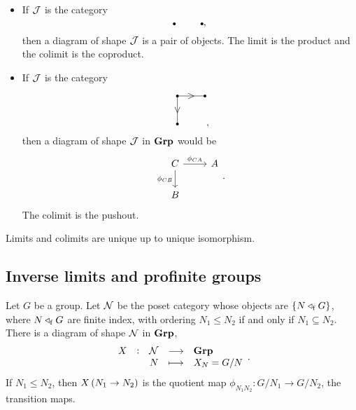 \begin{example}
\hfill
\begin{itemize}
\item If $ \mathcal{J} $ is the category
$$
\begin{tikzpicture}
\fill (0, 0) circle (0.05);
\fill (1, 0) circle (0.05);
\end{tikzpicture},
$$
then a diagram of shape $ \mathcal{J} $ is a pair of objects. The limit is the product and the colimit is the coproduct.
\item If $ \mathcal{J} $ is the category
$$
\begin{tikzpicture}
\fill (0, 0) circle (0.05);
\fill (1, 0) circle (0.05);
\fill (0, -1) circle (0.05);
\draw (0, 0) to node{$ > $} (1, 0);
\draw (0, 0) to node{$ \vee $} (0, -1);
\end{tikzpicture},
$$
then a diagram of shape $ \mathcal{J} $ in $ \textbf{Grp} $ would be
$$
\begin{tikzcd}
C \arrow{r}{\phi_{CA}} \arrow{d}[swap]{\phi_{CB}} & A \\
B &
\end{tikzcd}.
$$
The colimit is the pushout.
\end{itemize}
\end{example}

\begin{proposition}
Limits and colimits are unique up to unique isomorphism.
\end{proposition}

\pagebreak

\subsection{Inverse limits and profinite groups}

Let $ G $ be a group. Let $ \mathcal{N} $ be the poset category whose objects are $ \cbr{N \triangleleft_\f G} $, where $ N \triangleleft_{\mathrm{f}} G $ are finite index, with ordering $ N_1 \le N_2 $ if and only if $ N_1 \subseteq N_2 $. There is a diagram of shape $ \mathcal{N} $ in $ \textbf{Grp} $,
$$ \function[X]{\NNN}{\Grp}{N}{X_N = G / N}. $$
If $ N_1 \le N_2 $, then $ X\br{N_1 \to N_2} $ is the quotient map $ \phi_{N_1N_2} : G / N_1 \to G / N_2 $, the transition maps.

